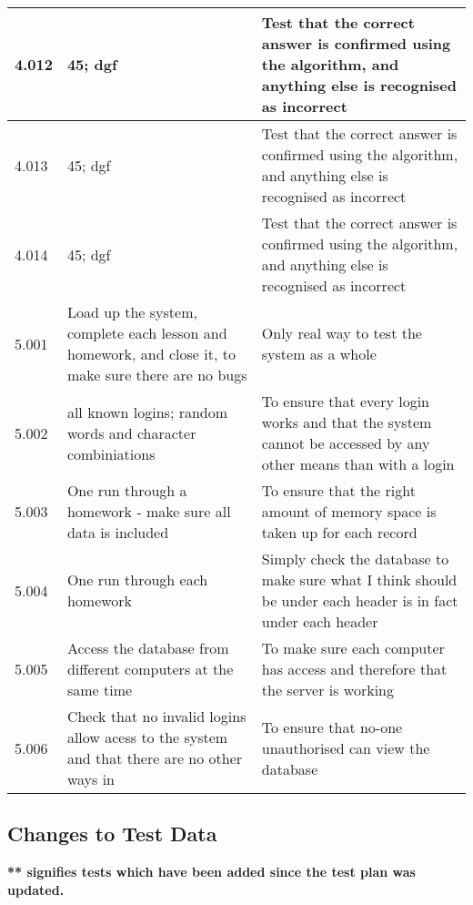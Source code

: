 \begin{landscape}
\begin{center}
\begin{longtable}{|p{4cm}|p{4cm}|p{5cm}|}
4.012 & 45; dgf & Test that the correct answer is confirmed using the algorithm, and anything else is recognised as incorrect \\ \hline
4.013 & 45; dgf & Test that the correct answer is confirmed using the algorithm, and anything else is recognised as incorrect \\ \hline
4.014 & 45; dgf & Test that the correct answer is confirmed using the algorithm, and anything else is recognised as incorrect \\ \hline
5.001 & Load up the system, complete each lesson and homework, and close it, to make sure there are no bugs & Only real way to test the system as a whole \\ \hline
5.002 & all known logins; random words and character combiniations & To ensure that every login works and that the system cannot be accessed by any other means than with a login \\ \hline
5.003 & One run through a homework - make sure all data is included & To ensure that the right amount of memory space is taken up for each record \\ \hline
5.004 & One run through each homework & Simply check the database to make sure what I think should be under each header is in fact under each header \\ \hline
5.005 & Access the database from different computers at the same time & To make sure each computer has access and therefore that the server is working \\ \hline
5.006 & Check that no invalid logins allow acess to the system and that there are no other ways in & To ensure that no-one unauthorised can view the database \\ \hline
\end{longtable}
\end{center}

\subsection{Changes to Test Data}

\textbf{** signifies tests which have been added since the test plan was updated.}


\end{landscape}
